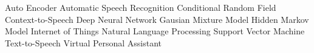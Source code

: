 


  {Auto Encoder}
 {Automatic Speech Recognition}
 {Conditional Random Field}
 {Context-to-Speech}
 {Deep Neural Network}
 {Gausian Mixture Model}
 {Hidden Markov Model}
 {Internet of Things}
 {Natural Language Processing}
 {Support Vector Machine}
 {Text-to-Speech}
 {Virtual Personal Assistant}



